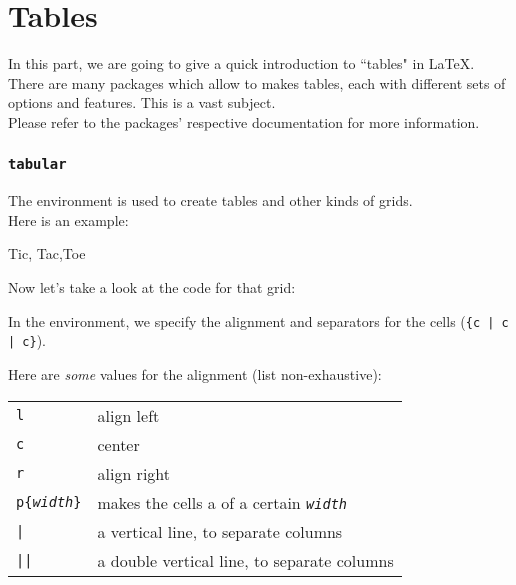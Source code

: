 
\part{Tables}

In this part, we are going to give a quick introduction to ``tables" in \LaTeX. \\

There are many packages which allow to makes tables, each with different sets of options and features. This is a vast subject. \\

Please refer to the packages' respective documentation for more information.


\section{\texttt{tabular}}

The  environment is used to create tables and other kinds of grids. \\

Here is an example:
\begin{table}[h]
	\caption{Tic, Tac,Toe}
	\medskip
	\centering

\end{table}

Now let's take a look at the code for that grid:


\bigskip

In the  environment, we specify the alignment and separators for the cells (\texttt{\{c | c | c\}}).

Here are \emph{some} values for the alignment (list non-exhaustive): \\
\begin{center}
	\begin{tabular}{l l}
		\texttt{l} & align left \\
		\texttt{c} & center \\
		\texttt{r} & align right \\
		\texttt{p\{\textit{width}\}} & makes the cells a \quoteCmd{parbox} of a certain \texttt{\textit{width}} \\
		\texttt{|} & a vertical line, to separate columns  \\
		\texttt{||} & a double vertical line, to separate columns \\
	\end{tabular}
\end{center}


